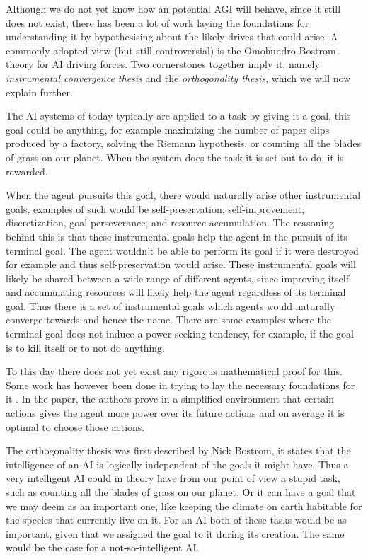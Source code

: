 \documentclass[12pt,A4]{report}
\theoremstyle{definition}
\begin{document}
Although we do not yet know how an potential AGI will behave, since it still does not exist, there has been a lot of work laying the foundations for understanding it by hypothesising about the likely drives that could arise. A commonly adopted view (but still controversial) is the Omohundro-Bostrom theory for AI driving forces. Two cornerstones together imply it, namely \textit{instrumental convergence thesis} and the \textit{orthogonality thesis}, which we will now explain further.

The AI systems of today typically are applied to a task by giving it a goal, this goal could be anything, for example maximizing the number of paper clips produced by a factory, solving the Riemann hypothesis, or counting all the blades of grass on our planet. When the system does the task it is set out to do, it is rewarded.

When the agent pursuits this goal, there would naturally arise other instrumental goals, examples of such would be self-preservation, self-improvement, discretization, goal perseverance, and resource accumulation\autocite{Omohundro}. The reasoning behind this is that these instrumental goals help the agent in the pursuit of its terminal goal. The agent wouldn't be able to perform its goal if it were destroyed for example and thus self-preservation would arise. These instrumental goals will likely be shared between a wide range of different agents, since improving itself and accumulating resources will likely help the agent regardless of its terminal goal. Thus there is a set of instrumental goals which agents would naturally converge towards and hence the name. There are some examples where the terminal goal does not induce a power-seeking tendency, for example, if the goal is to kill itself or to not do anything. 

To this day there does not yet exist any rigorous mathematical proof for this. Some work has however been done in trying to lay the necessary foundations for it \autocite{TURNER et al}. In the paper, the authors prove in a simplified environment that certain actions gives the agent more power over its future actions and on average it is optimal to choose those actions. 

The orthogonality thesis was first described by Nick Bostrom\cite{Bostrom2}, it states that the intelligence of an AI is logically independent of the goals it might have. Thus a very intelligent AI could in theory have from our point of view a stupid task, such as counting all the blades of grass on our planet. Or it can have a goal that we may deem as an important one, like keeping the climate on earth habitable for the species that currently live on it. For an AI both of these tasks would be as important, given that we assigned the goal to it during its creation. The same would be the case for a not-so-intelligent AI.
\end{document}
